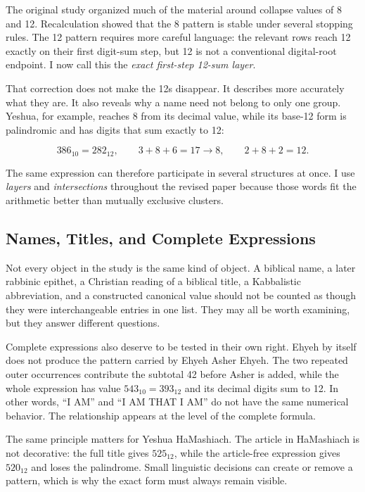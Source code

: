 The original study organized much of the material around collapse values of 8 and 12. Recalculation showed that the 8 pattern is stable under several stopping rules. The 12 pattern requires more careful language: the relevant rows reach 12 exactly on their first digit-sum step, but 12 is not a conventional digital-root endpoint. I now call this the \emph{exact first-step 12-sum layer}.

That correction does not make the 12s disappear. It describes more accurately what they are. It also reveals why a name need not belong to only one group. Yeshua, for example, reaches 8 from its decimal value, while its base-12 form is palindromic and has digits that sum exactly to 12:

\[
386_{10}=282_{12},
\qquad
3+8+6=17\rightarrow8,
\qquad
2+8+2=12.
\]

The same expression can therefore participate in several structures at once. I use \emph{layers} and \emph{intersections} throughout the revised paper because those words fit the arithmetic better than mutually exclusive clusters.

\subsection{Names, Titles, and Complete Expressions}

Not every object in the study is the same kind of object. A biblical name, a later rabbinic epithet, a Christian reading of a biblical title, a Kabbalistic abbreviation, and a constructed canonical value should not be counted as though they were interchangeable entries in one list. They may all be worth examining, but they answer different questions.

Complete expressions also deserve to be tested in their own right. Ehyeh by itself does not produce the pattern carried by Ehyeh Asher Ehyeh. The two repeated outer occurrences contribute the subtotal 42 before Asher is added, while the whole expression has value $543_{10}=393_{12}$ and its decimal digits sum to 12. In other words, ``I AM'' and ``I AM THAT I AM'' do not have the same numerical behavior. The relationship appears at the level of the complete formula.

The same principle matters for Yeshua HaMashiach. The article in HaMashiach is not decorative: the full title gives $525_{12}$, while the article-free expression gives $520_{12}$ and loses the palindrome. Small linguistic decisions can create or remove a pattern, which is why the exact form must always remain visible.

